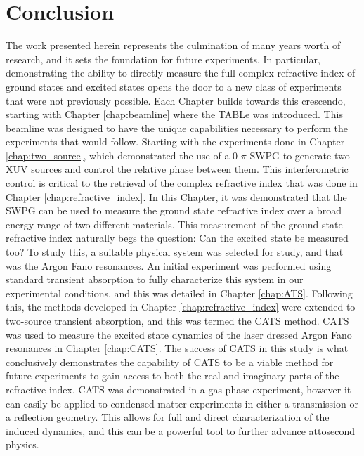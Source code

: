 \chapter{Conclusion}
\label{chap:conclusion}


The work presented herein represents the culmination of many years worth of research, and it sets the foundation for future experiments. In particular, demonstrating the ability to directly measure the full complex refractive index of ground states and excited states opens the door to a new class of experiments that were not previously possible.  Each Chapter builds towards this crescendo, starting with Chapter \ref{chap:beamline} where the TABLe was introduced.  This beamline was designed to have the unique capabilities necessary to perform the experiments that would follow.  Starting with the experiments done in Chapter \ref{chap:two_source}, which demonstrated the use of a 0-$\pi$ SWPG to generate two XUV sources and control the relative phase between them.  This interferometric control is critical to the retrieval of the complex refractive index that was done in Chapter \ref{chap:refractive_index}.  In this Chapter, it was demonstrated that the SWPG can be used to measure the ground state refractive index over a broad energy range of two different materials.  This measurement of the ground state refractive index naturally begs the question: Can the excited state be measured too?  To study this, a suitable physical system was selected for study, and that was the Argon Fano resonances.  An initial experiment was performed using standard transient absorption to fully characterize this system in our experimental conditions, and this was detailed in Chapter \ref{chap:ATS}.  Following this, the methods developed in Chapter \ref{chap:refractive_index} were extended to two-source transient absorption, and this was termed the CATS method.  CATS was used to measure the excited state dynamics of the laser dressed Argon Fano resonances in Chapter \ref{chap:CATS}.  The success of CATS in this study is what conclusively demonstrates the capability of CATS to be a viable method for future experiments to gain access to both the real and imaginary parts of the refractive index.  CATS was demonstrated in a gas phase experiment, however it can easily be applied to condensed matter experiments in either a transmission or a reflection geometry.  This allows for full and direct characterization of the induced dynamics, and this can be a powerful tool to further advance attosecond physics.





